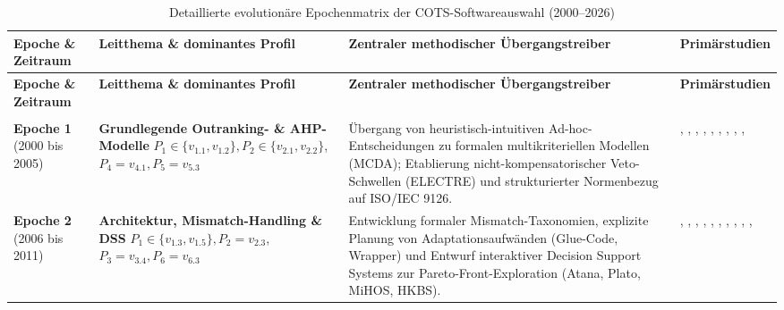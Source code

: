 \begin{landscape}
\begin{xltabular}{\linewidth}{>{\raggedright\arraybackslash}p{2.8cm}>{\raggedright\arraybackslash}p{5.5cm}>{\raggedright\arraybackslash}X>{\raggedright\arraybackslash}p{5.5cm}}
  \caption{Detaillierte evolutionäre Epochenmatrix der COTS-Softwareauswahl (2000--2026)} \label{tab:anhang_epochen_matrix} \\
  \toprule
  \textbf{Epoche \& Zeitraum} & \textbf{Leitthema \& dominantes Profil} & \textbf{Zentraler methodischer Übergangstreiber} & \textbf{Primärstudien} \\
  \midrule
  \endfirsthead
  \toprule
  \textbf{Epoche \& Zeitraum} & \textbf{Leitthema \& dominantes Profil} & \textbf{Zentraler methodischer Übergangstreiber} & \textbf{Primärstudien} \\
  \midrule
  \endhead
  \midrule
   \\
  \bottomrule
  \endfoot
  \bottomrule
  \endlastfoot
  \textbf{Epoche 1} \newline (2000 bis 2005) 
    & \textbf{Grundlegende Outranking- \& AHP-Modelle} \newline
      $P_1 \in \{v_{1.1}, v_{1.2}\}, P_2 \in \{v_{2.1}, v_{2.2}\}$, \newline
      $P_4 = v_{4.1}, P_5 = v_{5.3}$
    & Übergang von heuristisch-intuitiven Ad-hoc-Entscheidungen zu formalen multikriteriellen Modellen (MCDA); Etablierung nicht-kompensatorischer Veto-Schwellen (ELECTRE) und strukturierter Normenbezug auf ISO/IEC 9126.
    & \textcite{LZQJ6M4X}, \textcite{M3B2D3GD}, \textcite{QDUNCXFC}, \textcite{FCYW9EWJ}, \textcite{DAU8NSK8}, \textcite{CI86GRRG}, \textcite{TLB687YL}, \textcite{CZZ6XQZJ}, \textcite{8XNYS4M9}, \textcite{U5JPV4SF} \\
  \addlinespace[6pt]
  \textbf{Epoche 2} \newline (2006 bis 2011) 
    & \textbf{Architektur, Mismatch-Handling \& DSS} \newline
      $P_1 \in \{v_{1.3}, v_{1.5}\}, P_2 = v_{2.3}$, \newline
      $P_3 = v_{3.4}, P_6 = v_{6.3}$
    & Entwicklung formaler Mismatch-Taxonomien, explizite Planung von Adaptationsaufwänden (Glue-Code, Wrapper) und Entwurf interaktiver Decision Support Systems zur Pareto-Front-Exploration (Atana, Plato, MiHOS, HKBS).
    & \textcite{6RNULWVY}, \textcite{9F79VAAB}, \textcite{ZQMG69VT}, \textcite{MZ8JHDYA}, \textcite{8VHUMEKY}, \textcite{VUVLUN85}, \textcite{WBGP3ETU}, \textcite{U4E7VXQU}, \textcite{W8P543Y2}, \textcite{DFASRUVC}, \textcite{JT5X3FIG} \\

\end{xltabular}
\end{landscape}
